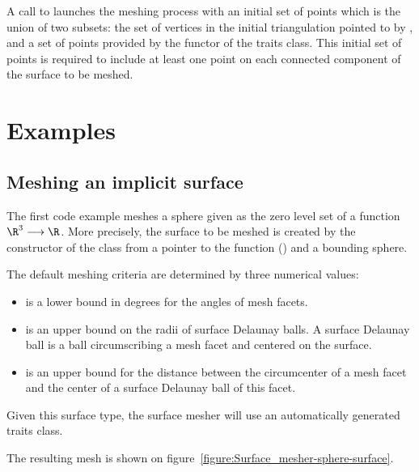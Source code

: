 A call to 
 launches 
the meshing process with an initial 
set of points which is the union of two subsets:
the set of vertices in the  initial triangulation pointed to by ,
and a set of points provided by the  functor 
of the traits class. This initial set of points is required 
to include at least one point on each connected component of the surface
to be meshed.


\section{Examples}
\label{SurfaceMesher_section_example}

\subsection{Meshing an implicit surface}
The first code example meshes a sphere 
given as the zero level set of a function $\R^3 \longrightarrow \R$.
More precisely, 
the surface to be meshed is created 
by the constructor
of the class 
from a pointer to the function ()
and a bounding sphere.

The default meshing criteria are determined  by three numerical
values: 
\begin{itemize}
\item {} is a lower bound in degrees for the angles 
     of mesh facets.
\item {} is an upper bound on the radii of surface Delaunay
balls. A surface Delaunay ball is a ball circumscribing a mesh facet
and centered on the surface. 
\item {} is an upper bound for the distance 
between the circumcenter of a mesh facet and the center of a surface
Delaunay ball of this facet.
\end{itemize}

Given this surface type, the surface mesher will use
an automatically generated traits class.

The resulting mesh is shown on 
figure~\ref{figure:Surface_mesher-sphere-surface}.

